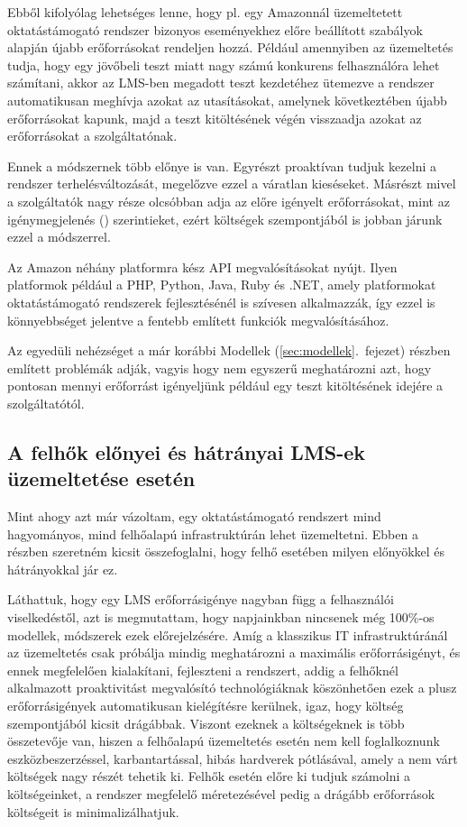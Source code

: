 Ebből kifolyólag lehetséges lenne, hogy pl. egy Amazonnál üzemeltetett oktatástámogató rendszer bizonyos eseményekhez előre beállított szabályok alapján újabb erőforrásokat rendeljen hozzá. Például amennyiben az üzemeltetés tudja, hogy egy jövőbeli teszt miatt nagy számú konkurens felhasználóra lehet számítani, akkor az LMS-ben megadott teszt kezdetéhez ütemezve a rendszer automatikusan meghívja azokat az utasításokat, amelynek következtében újabb erőforrásokat kapunk, majd a teszt kitöltésének végén visszaadja azokat az erőforrásokat a szolgáltatónak.

Ennek a módszernek több előnye is van. Egyrészt proaktívan tudjuk kezelni a rendszer terhelésváltozását, megelőzve ezzel a váratlan kieséseket. Másrészt mivel a szolgáltatók nagy része olcsóbban adja az előre igényelt erőforrásokat, mint az igénymegjelenés () szerintieket, ezért költségek szempontjából is jobban járunk ezzel a módszerrel.

Az Amazon néhány platformra kész API megvalósításokat nyújt. Ilyen platformok például a PHP, Python, Java, Ruby és .NET, amely platformokat oktatástámogató rendszerek fejlesztésénél is szívesen alkalmazzák, így ezzel is könnyebbséget jelentve a fentebb említett funkciók megvalósításához.

Az egyedüli nehézséget a már korábbi Modellek (\ref{sec:modellek}.~fejezet) részben említett problémák adják, vagyis hogy nem egyszerű meghatározni azt, hogy pontosan mennyi erőforrást igényeljünk például egy teszt kitöltésének idejére a szolgáltatótól. 

\subsection{A felhők előnyei és hátrányai LMS-ek üzemeltetése esetén}

Mint ahogy azt már vázoltam, egy oktatástámogató rendszert mind hagyományos, mind felhőalapú infrastruktúrán lehet üzemeltetni. Ebben a részben szeretném kicsit összefoglalni, hogy felhő esetében milyen előnyökkel és hátrányokkal jár ez.

Láthattuk, hogy egy LMS erőforrásigénye nagyban függ a felhasználói viselkedéstől, azt is megmutattam, hogy napjainkban nincsenek még 100\%-os modellek, módszerek ezek előrejelzésére. Amíg a klasszikus IT infrastruktúránál az üzemeltetés csak próbálja mindig meghatározni a maximális erőforrásigényt, és ennek megfelelően kialakítani, fejleszteni a rendszert, addig a felhőknél alkalmazott proaktivitást megvalósító technológiáknak köszönhetően ezek a plusz erőforrásigények automatikusan kielégítésre kerülnek, igaz, hogy költség szempontjából kicsit drágábbak. Viszont ezeknek a költségeknek is több összetevője van, hiszen a felhőalapú üzemeltetés esetén nem kell foglalkoznunk eszközbeszerzéssel, karbantartással, hibás hardverek pótlásával, amely a nem várt költségek nagy részét tehetik ki. Felhők esetén előre ki tudjuk számolni a költségeinket, a rendszer megfelelő méretezésével pedig a drágább  erőforrások költségeit is minimalizálhatjuk.

